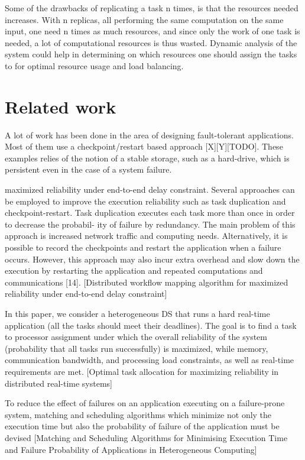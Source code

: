 \documentclass{cslthse-msc}
\begin{document}
Some of the drawbacks of replicating a task n times, is that the resources needed increases. With n replicas, all performing the same computation on the same input, one need n times as much resources, and since only the work of one task is needed, a lot of computational resources is thus wasted. Dynamic analysis of the system could help in determining on which resources one should assign the tasks to for optimal resource usage and load balancing.


\section{Related work} \label{sec:related_work}
A lot of work has been done in the area of designing fault-tolerant applications. Most of them use a checkpoint/restart based approach [X][Y][TODO]. These examples relies of the notion of a stable storage, such as a hard-drive, which is persistent even in the case of a system failure. 

maximized reliability under end-to-end delay constraint.
Several approaches can be employed to improve the execution reliability such as task duplication and checkpoint-restart. Task duplication executes each task more than once in order to decrease the probabil- ity of failure by redundancy. The main problem of this approach is increased network traffic and computing needs. Alternatively, it is possible to record the checkpoints and restart the application when a failure occurs. However, this approach may also incur extra overhead and slow down the execution by restarting the application and repeated computations and communications [14]. [Distributed workflow mapping algorithm for maximized reliability under end-to-end delay constraint]

In this paper, we consider a heterogeneous DS that runs a hard real-time application (all the tasks should meet their deadlines). The goal is to find a task to processor assignment under which the overall reliability of the system (probability that all tasks run successfully) is maximized, while memory, communication bandwidth, and processing load constraints, as well as real-time requirements are met. [Optimal task allocation for maximizing reliability in distributed real-time systems]

To reduce the effect of failures on an application executing on a failure-prone system, matching and scheduling algorithms which minimize not only the execution time but also the probability of failure of the application must be devised [Matching and Scheduling Algorithms for Minimising Execution Time and Failure Probability of Applications in Heterogeneous Computing]
\end{document}
